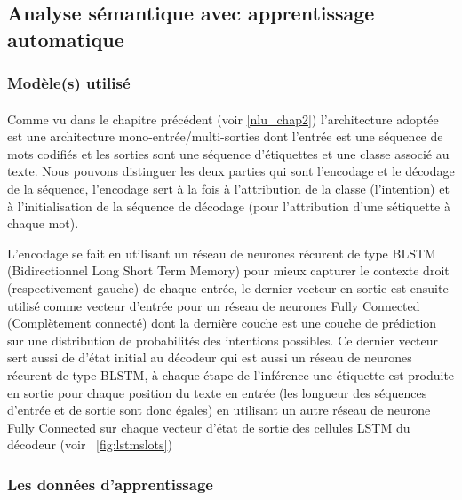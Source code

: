 	\subsection{Analyse sémantique avec apprentissage automatique}
		\subsubsection{Modèle(s) utilisé}
		\paragraph{}\label{joint_model}
		Comme vu dans le chapitre précédent (voir \ref{nlu_chap2}) l'architecture adoptée est une architecture mono-entrée/multi-sorties dont l'entrée est une séquence de mots codifiés et les sorties sont une séquence d'étiquettes et une classe associé au texte. Nous pouvons distinguer les deux parties qui sont l'encodage et le décodage de la séquence, l'encodage sert à la fois à l'attribution de la classe (l'intention) et à l'initialisation de la séquence de décodage (pour l'attribution d'une sétiquette à chaque mot).
		\par
		L'encodage se fait en utilisant un réseau de neurones récurent de type BLSTM (Bidirectionnel Long Short Term Memory) pour mieux capturer le contexte droit (respectivement gauche) de chaque entrée, le dernier vecteur en sortie est ensuite utilisé comme vecteur d'entrée pour un réseau de neurones Fully Connected (Complètement connecté) dont la dernière couche est une couche de prédiction sur une distribution de probabilités des intentions possibles. Ce dernier vecteur sert aussi de d'état initial au décodeur qui est aussi un réseau de neurones récurent de type BLSTM, à chaque étape de l'inférence une étiquette est produite en sortie pour chaque position du texte en entrée (les longueur des séquences d'entrée et de sortie sont donc égales) en utilisant un autre réseau de neurone Fully Connected sur chaque vecteur d'état de sortie des cellules LSTM du décodeur (voir ~\ref{fig:lstmslots})
		\subsubsection{Les données d'apprentissage}
